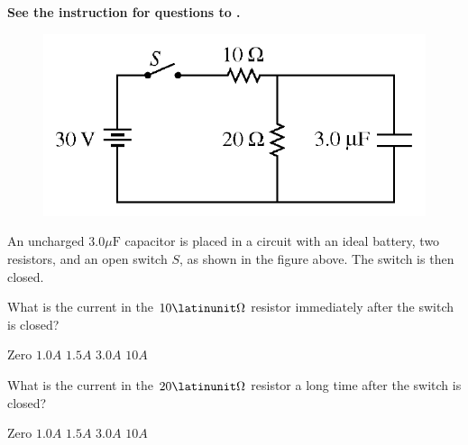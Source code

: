 \textbf{See the instruction for questions  to .}

\begin{figure}[H]
    \centering
    \includegraphics[scale=0.5]{images/24.25.png}
\end{figure}

An uncharged $3.0 \mu \mathrm{F}$ capacitor is placed in a circuit with an ideal battery, two resistors, and an open switch $S$, as shown in the figure above. The switch is then closed.

\begin{questions}\setcounter{question}{23}\question
What is the current in the $10 \latinunit\Omega$ resistor immediately after the switch is closed?

\begin{oneparchoices}
\choice Zero
\choice $1.0 \unit{A}$
\choice $1.5 \unit{A}$
\choice $3.0 \unit{A}$
\choice $10 \unit{A}$
\end{oneparchoices}\end{questions}

\begin{questions}\setcounter{question}{24}\question
What is the current in the $20 \latinunit\Omega$ resistor a long time after the switch is closed?

\begin{oneparchoices}
\choice Zero
\choice $1.0 \unit{A}$
\choice $1.5 \unit{A}$
\choice $3.0 \unit{A}$
\choice $10 \unit{A}$
\end{oneparchoices}\end{questions}
